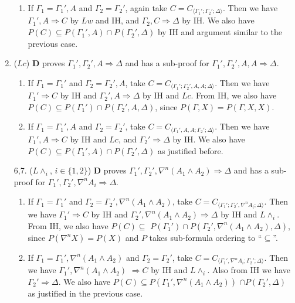\begin{enumerate}
\begin{enumerate}
		\item If $\Gamma_1 = \Gamma_1' , A$ and $\Gamma_2 = \Gamma_2'$, again take $C = C_{\langle\Gamma_1';\Gamma_2';\Delta\rangle}$. Then we have  $\Gamma_1' , A \Rightarrow C$ by $Lw$ and IH, and $\Gamma_2 , C \Rightarrow \Delta$ by IH. We also have $P(C) \subseteq P(\Gamma_1' , A) \cap P(\Gamma_2' , \Delta)$ by IH and argument similar to the previous case.
	\end{enumerate}

	\item ($Lc$) $\mathbf{D}$ proves $\Gamma_1' , \Gamma_2' , A \Rightarrow \Delta$ and has a sub-proof for $\Gamma_1' , \Gamma_2' , A , A \Rightarrow \Delta$.
	\begin{enumerate}
		\item If $\Gamma_1 = \Gamma_1'$ and $\Gamma_2 = \Gamma_2' , A$, take $C = C_{\langle\Gamma_1';\Gamma_2',A,A;\Delta\rangle}$. Then we have $\Gamma_1' \Rightarrow C$ by IH and $\Gamma_2' , A \Rightarrow \Delta$ by IH and $Lc$. From IH, we also have $P(C) \subseteq P(\Gamma_1') \cap P(\Gamma_2',A,\Delta)$, since $P(\Gamma,X) = P(\Gamma,X,X)$.
		
		\item If $\Gamma_1 = \Gamma_1' , A$ and $\Gamma_2 = \Gamma_2'$, take $C = C_{\langle\Gamma_1',A,A;\Gamma_2';\Delta\rangle}$. Then we have $\Gamma_1' , A \Rightarrow C$ by IH and $Lc$, and $\Gamma_2' \Rightarrow \Delta$ by IH. We also have $P(C) \subseteq P(\Gamma_1',A) \cap P(\Gamma_2',\Delta)$ as justified before.
	\end{enumerate}

	\item[6,7.] ($L\land_i$, {\small$i \in \{1,2\}$}) $\mathbf{D}$ proves $\Gamma_1' , \Gamma_2' , \nabla^n (A_1 \land A_2) \Rightarrow \Delta$ and has a sub-proof for $\Gamma_1' , \Gamma_2' , \nabla^n A_i \Rightarrow \Delta$.
	\begin{enumerate}
		\item If $\Gamma_1 = \Gamma_1'$ and $\Gamma_2 = \Gamma_2' , \nabla^n (A_1 \land A_2)$, take $C = C_{\langle\Gamma_1';\Gamma_2',\nabla^n A_i;\Delta\rangle}$. Then we have $\Gamma_1' \Rightarrow C$ by IH and $\Gamma_2' , \nabla^n (A_1 \land A_2) \Rightarrow \Delta$ by IH and $L\land_i$. From IH, we also have $P(C) \subseteq$ $P(\Gamma_1') \cap P(\Gamma_2',\nabla^n(A_1 \land A_2),\Delta)$, since $P(\nabla^n X) = P(X)$ and $P$ takes sub-formula ordering to ``$\subseteq$''.
		
		\item If $\Gamma_1 = \Gamma_1' , \nabla^n (A_1 \land A_2)$ and $\Gamma_2 = \Gamma_2'$, take $C = C_{\langle\Gamma_1',\nabla^n A_i;\Gamma_2';\Delta\rangle}$. Then we have $\Gamma_1' , \nabla^n (A_1 \land A_2)$ $\Rightarrow C$ by IH and $L\land_i$. Also from IH we have $\Gamma_2' \Rightarrow \Delta$. We also have $P(C) \subseteq P(\Gamma_1',\nabla^n (A_1 \land A_2))$ $\cap P(\Gamma_2',\Delta)$ as justified in the previous case.
	\end{enumerate}
	\setcounter{enumi}{7}


\end{enumerate}
